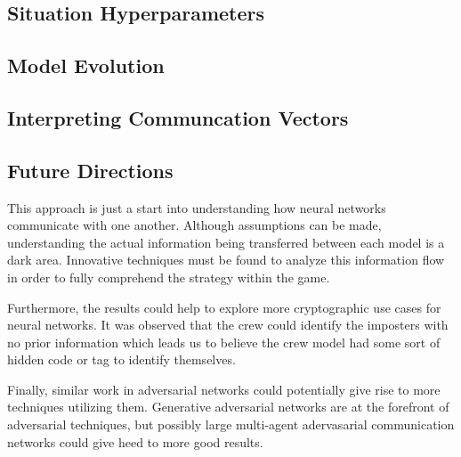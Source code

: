 \documentclass[10pt,twocolumn,letterpaper]{article}
\begin{document}
\subsection{Situation Hyperparameters}
\subsection{Model Evolution}
\subsection{Interpreting Communcation Vectors}
\subsection{Future Directions}
This approach is just a start into understanding how neural networks
communicate with one another. Although assumptions can be made,
understanding the actual information being transferred between each model is
a dark area. Innovative techniques must be found to analyze this information flow 
in order to fully comprehend the strategy within the game.

Furthermore, the results could help to explore more cryptographic use cases for neural networks.
It was observed that the crew could identify the imposters with no prior information which leads us to
believe the crew model had some sort of hidden code or tag to identify themselves.

Finally, similar work in adversarial networks could potentially give rise to
more techniques utilizing them. Generative adversarial networks are at the forefront of adversarial techniques, but possibly
large multi-agent adervasarial communication networks could give heed to more good results.
{\small


}
\end{document}
